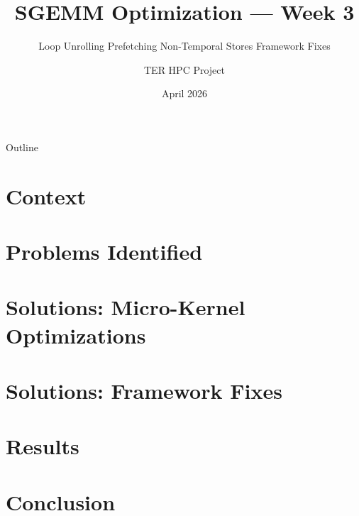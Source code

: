 \documentclass[aspectratio=169]{beamer}
\title{SGEMM Optimization --- Week 3}
\subtitle{Loop Unrolling \textperiodcentered{} Prefetching \textperiodcentered{} Non-Temporal Stores \textperiodcentered{} Framework Fixes}
\author{TER HPC Project}
\institute{M1 QDCS}
\date{April 2026}
\begin{document}
\begin{frame}
  \titlepage
\end{frame}

\begin{frame}{Outline}
  \tableofcontents
\end{frame}

\section{Context}
\section{Problems Identified}
\section{Solutions: Micro-Kernel Optimizations}
\section{Solutions: Framework Fixes}
\section{Results}
\section{Conclusion}
\end{document}
